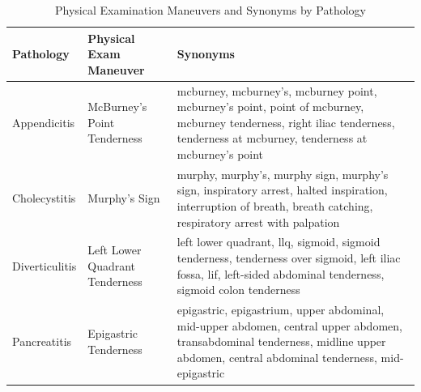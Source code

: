 \documentclass[manuscript, nonacm]{acmart}
\begin{document}
\begin{table}[H]
\centering
\small
\begin{tabular}{p{1.8cm}p{2.5cm}p{3.2cm}}
\toprule
\textbf{Pathology} & \textbf{Physical Exam Maneuver} & \textbf{Synonyms} \\
\midrule
Appendicitis & McBurney's Point Tenderness & 
mcburney, mcburney's, mcburney point, mcburney's point, point of mcburney, mcburney tenderness, right iliac tenderness, tenderness at mcburney, tenderness at mcburney's point \\
\midrule
Cholecystitis & Murphy's Sign & 
murphy, murphy's, murphy sign, murphy's sign, inspiratory arrest, halted inspiration, interruption of breath, breath catching, respiratory arrest with palpation \\
\midrule
Diverticulitis & Left Lower Quadrant Tenderness & 
left lower quadrant, llq, sigmoid, sigmoid tenderness, tenderness over sigmoid, left iliac fossa, lif, left-sided abdominal tenderness, sigmoid colon tenderness \\
\midrule
Pancreatitis & Epigastric Tenderness & 
epigastric, epigastrium, upper abdominal, mid-upper abdomen, central upper abdomen, transabdominal tenderness, midline upper abdomen, central abdominal tenderness, mid-epigastric \\
\bottomrule
\end{tabular}
\caption{Physical Examination Maneuvers and Synonyms by Pathology}
\label{tab:physical_exam}
\end{table}
\end{document}
